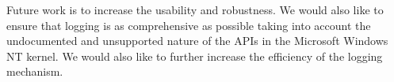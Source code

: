 Future work is to increase the usability and robustness.
We would also like to ensure that logging is as comprehensive as possible
taking into account the undocumented
and unsupported nature of the APIs in the Microsoft Windows NT kernel.
We would also like to further increase the efficiency of the
logging mechanism.


% 
% 
% 
% 
% 
% 
% 
% 
% 
% 
% 
% 
% 
% 
% 
% 
% 
% 
% 
